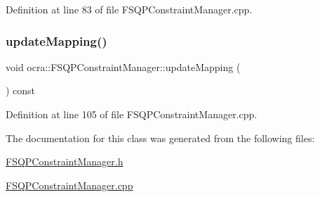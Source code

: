 Definition at line 83 of file F\+S\+Q\+P\+Constraint\+Manager.\+cpp.

\hypertarget{classocra_1_1FSQPConstraintManager_a1476ee24e4852fcc7f328b7aa3486c14}{}\label{classocra_1_1FSQPConstraintManager_a1476ee24e4852fcc7f328b7aa3486c14} 
\subsubsection{\texorpdfstring{update\+Mapping()}{updateMapping()}}
{\footnotesize\ttfamily void ocra\+::\+F\+S\+Q\+P\+Constraint\+Manager\+::update\+Mapping (\begin{DoxyParamCaption}{ }\end{DoxyParamCaption}) const}



Definition at line 105 of file F\+S\+Q\+P\+Constraint\+Manager.\+cpp.



The documentation for this class was generated from the following files\+:\begin{DoxyCompactItemize}
\item 
\hyperlink{FSQPConstraintManager_8h}{F\+S\+Q\+P\+Constraint\+Manager.\+h}\item 
\hyperlink{FSQPConstraintManager_8cpp}{F\+S\+Q\+P\+Constraint\+Manager.\+cpp}\end{DoxyCompactItemize}
